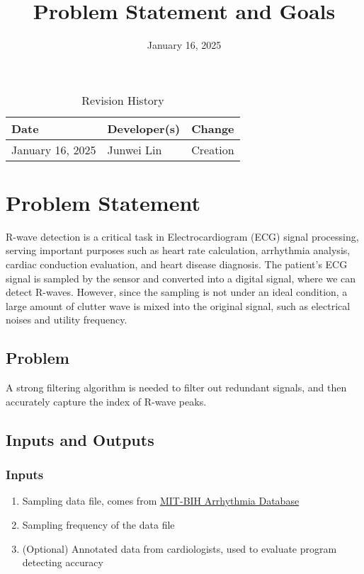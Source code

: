 \documentclass{article}
\title{Problem Statement and Goals\\\progname}
\author{\authname}
\date{January 16, 2025}
\begin{document}
\maketitle

\begin{table}[hp]
\caption{Revision History} \label{TblRevisionHistory}
\begin{tabularx}{\textwidth}{llX}
\toprule
\textbf{Date} & \textbf{Developer(s)} & \textbf{Change}\\
\midrule
January 16, 2025 & Junwei Lin & Creation\\
\bottomrule
\end{tabularx}
\end{table}

\section{Problem Statement}

R-wave detection is a critical task in Electrocardiogram (ECG) signal processing, serving important purposes such as heart rate calculation, arrhythmia analysis, cardiac conduction evaluation, and heart disease diagnosis. The patient's ECG signal is sampled by the sensor and converted into a digital signal, where we can detect R-waves. However, since the sampling is not under an ideal condition, a large amount of clutter wave is mixed into the original signal, such as electrical noises and utility frequency.

\subsection{Problem}

A strong filtering algorithm is needed to filter out redundant signals, and then accurately capture the index of R-wave peaks.

\subsection{Inputs and Outputs}

\subsubsection{Inputs}

\begin{enumerate}
    \item Sampling data file, comes from \href{https://physionet.org/content/mitdb/1.0.0/} {MIT-BIH Arrhythmia Database}
    \item Sampling frequency of the data file
    \item (Optional) Annotated data from cardiologists, used to evaluate program detecting accuracy
\end{enumerate}
\end{document}
